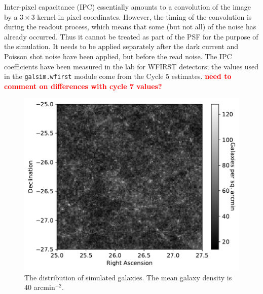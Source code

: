 \documentclass[aps,prd, amsmath,amssymb,superscriptaddress,showkeys,nofootinbib,reprint,preprintnumbers]{revtex4-1}
\newcommand{\verify}[1]{\textcolor{red}{\textbf{{#1}}}}
\begin{document}
Inter-pixel capacitance (IPC) essentially amounts to a convolution of the image by a $3 \times 3$ kernel in pixel coordinates.
However, the timing of the convolution is during the readout process, which means that some (but not all) of the noise has already occurred.  
Thus it cannot be treated as part of the PSF for the purpose of the simulation.  
It needs to be applied separately after the dark current and Poisson shot noise have been applied, but before the read noise.  
The IPC coefficients have been measured in the lab for WFIRST detectors; the values used in the \texttt{galsim.wfirst} module come from the Cycle 5 estimates. \verify{need to comment on differences with cycle 7 values?}

\begin{figure}
\begin{center}
\includegraphics[width=\columnwidth]{figures/galaxies.pdf}
\end{center}
\caption[]{
The distribution of simulated galaxies. The mean galaxy density is 40 arcmin$^{-2}$. 
\label{fig:galaxies}}
\end{figure}
\end{document}
